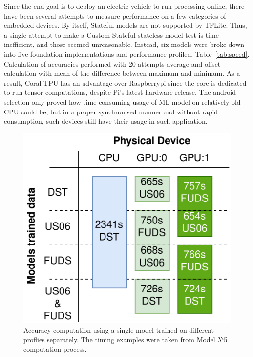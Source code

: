 %
%
Since the end goal is to deploy an electric vehicle to run processing online, there have been several attempts to measure performance on a few categories of embedded devices.
By itself, Stateful models are not supported by TFLite.
Thus, a single attempt to make a Custom Stateful stateless model test is time inefficient, and those seemed unreasonable.
Instead, six models were broke down into five foundation implementations and performance profiled, Table~\ref{tab:speed}.
Calculation of accuracies performed with 20 attempts average and offset calculation with mean of the difference between maximum and minimum.
As a result, Coral TPU has an advantage over Raspberrypi since the core is dedicated to run tensor computations, despite Pi's latest hardware release.
The android selection only proved how time-consuming usage of ML model on relatively old CPU could be, but in a proper synchronised manner and without rapid consumption, such devices still have their usage in such application.
\begin{figure}[ht]
    \centering
    \includegraphics[width=0.60\linewidth]{II_Body/images/Accuracy_Compute.png}
    \caption{Accuracy computation using a single model trained on different proflies separately. The timing examples were taken from Model №5 computation process.}
    \label{fig:device_compute}
\end{figure}
